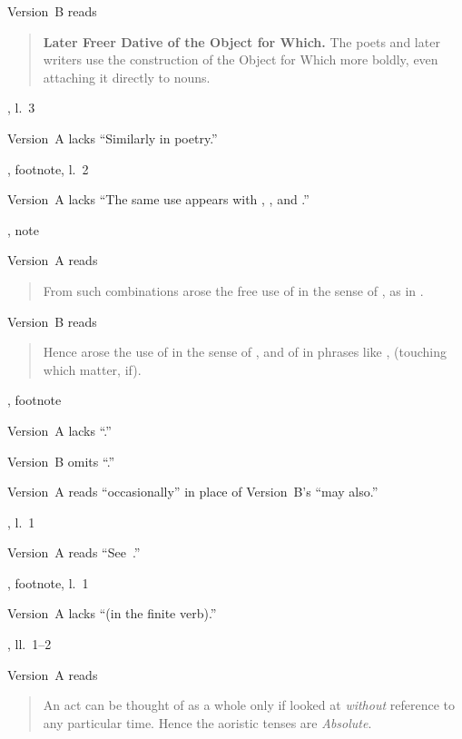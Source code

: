 \begin{variations}
Version~B reads
\begin{quote}
\textbf{Later Freer Dative of the Object for Which.}  The poets and
later writers use the construction of the Object for Which more
boldly, even attaching it directly to nouns.
\end{quote}

\item[{\xref[5]{364}, l.~3}]

Version~A lacks “Similarly  in poetry.”

\item[{\xref[III]{387}, footnote, l.~2}]

Version~A lacks “The same use appears with , , and .”

\item[{\xref[\emph{a}]{388}, note}]

Version~A reads
\begin{quote}
From such combinations arose the free use of  in the sense
of , as in   .
\end{quote}

Version~B reads
\begin{quote}
Hence arose the use of  in the sense of , and
of  in phrases like , 
(touching which matter, if).
\end{quote}

\item[{\xref[\emph{a}]{426}, footnote}]

Version~A lacks “.”

Version~B omits “.”

\item[{\xref[\emph{a}]{431}}]

Version~A reads “occasionally” in place of Version~B's “may also.”

\item[{\xref[3, \emph{b}]{438}, l.~1}]

Version~A reads “See~.”

\item[{\xref[1]{464}, footnote, l.~1}]

Version~A lacks “(in the finite verb).”

\item[{\xref[2]{467}, ll.~1–2}]

Version~A reads
\begin{quote}
An act can be thought of as a whole only if looked at \emph{without}
reference to any particular time.  Hence the aoristic tenses are
\emph{Absolute}.
\end{quote}


\end{variations}
